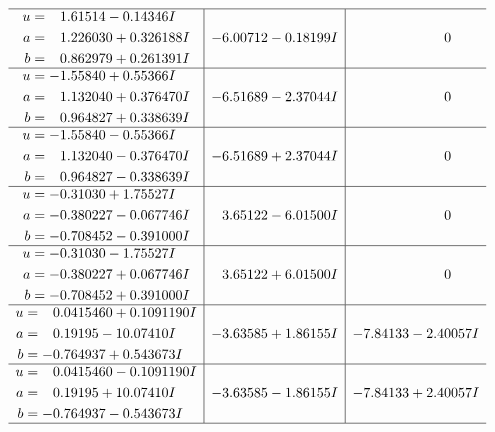 \documentclass[1p]{elsarticle_modified}
\theoremstyle{definition}
\begin{document}
$$\begin{array}{c|c|c}
 \hline 
\begin{aligned}
u &= \phantom{-}1.61514 - 0.14346 I \\
a &= \phantom{-}1.226030 + 0.326188 I \\
b &= \phantom{-}0.862979 + 0.261391 I\end{aligned}
 & -6.00712 - 0.18199 I & \phantom{-0.000000 } 0 \\ \hline\begin{aligned}
u &= -1.55840 + 0.55366 I \\
a &= \phantom{-}1.132040 + 0.376470 I \\
b &= \phantom{-}0.964827 + 0.338639 I\end{aligned}
 & -6.51689 - 2.37044 I & \phantom{-0.000000 } 0 \\ \hline\begin{aligned}
u &= -1.55840 - 0.55366 I \\
a &= \phantom{-}1.132040 - 0.376470 I \\
b &= \phantom{-}0.964827 - 0.338639 I\end{aligned}
 & -6.51689 + 2.37044 I & \phantom{-0.000000 } 0 \\ \hline\begin{aligned}
u &= -0.31030 + 1.75527 I \\
a &= -0.380227 - 0.067746 I \\
b &= -0.708452 - 0.391000 I\end{aligned}
 & \phantom{-}3.65122 - 6.01500 I & \phantom{-0.000000 } 0 \\ \hline\begin{aligned}
u &= -0.31030 - 1.75527 I \\
a &= -0.380227 + 0.067746 I \\
b &= -0.708452 + 0.391000 I\end{aligned}
 & \phantom{-}3.65122 + 6.01500 I & \phantom{-0.000000 } 0 \\ \hline\begin{aligned}
u &= \phantom{-}0.0415460 + 0.1091190 I \\
a &= \phantom{-}0.19195 - 10.07410 I \\
b &= -0.764937 + 0.543673 I\end{aligned}
 & -3.63585 + 1.86155 I & -7.84133 - 2.40057 I \\ \hline\begin{aligned}
u &= \phantom{-}0.0415460 - 0.1091190 I \\
a &= \phantom{-}0.19195 + 10.07410 I \\
b &= -0.764937 - 0.543673 I\end{aligned}
 & -3.63585 - 1.86155 I & -7.84133 + 2.40057 I\\
 \hline 
 \end{array}$$\newpage\newpage\renewcommand{\arraystretch}{1}
\end{document}
